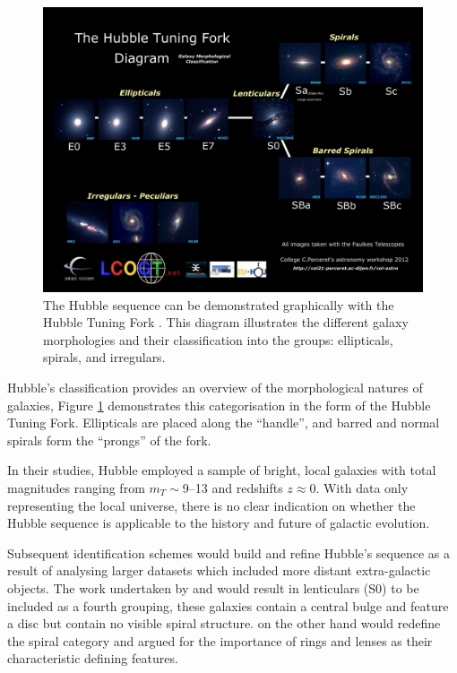 \documentclass[12pt, twocolumn]{revtex4}    %
\begin{document}
\begin{figure}
\includegraphics[width=\textwidth]{introduction/hubble-tuning-fork-diagram}
\captionsetup{justification=raggedright}
\caption[Hubble Tuning Fork]{The Hubble sequence can be demonstrated graphically with the Hubble Tuning Fork \citep{hubble_tuning_fork} . This diagram illustrates the different galaxy morphologies and their classification into the groups: ellipticals, spirals, and irregulars.}
\label{fig:hubble_tuning_fork}
\end{figure}

Hubble's classification provides an overview of the morphological natures of galaxies, Figure \ref{fig:hubble_tuning_fork} demonstrates this categorisation in the form of the Hubble Tuning Fork. Ellipticals are placed along the ``handle'', and barred and normal spirals form the ``prongs'' of the fork. 

In their studies, Hubble employed a sample of bright, local galaxies with total magnitudes ranging from $m_T\sim$9--13 and redshifts $z\approx0$. With data only representing the local universe, there is no clear indication on whether the Hubble sequence is applicable to the history and future of galactic evolution. 

Subsequent identification schemes would build and refine Hubble's sequence as a result of analysing larger datasets which included more distant extra-galactic objects. The work undertaken by \cite{1961hag..book.....S, 1975gaun.book....1S} and \cite{1994cag..book.....S} would result in lenticulars (S0) to be included as a fourth grouping, these galaxies contain a central bulge and feature a disc but contain no visible spiral structure. \cite{1959HDP....53..275D} on the other hand would redefine the spiral category and argued for the importance of rings and lenses as their characteristic defining features. 
\end{document}
